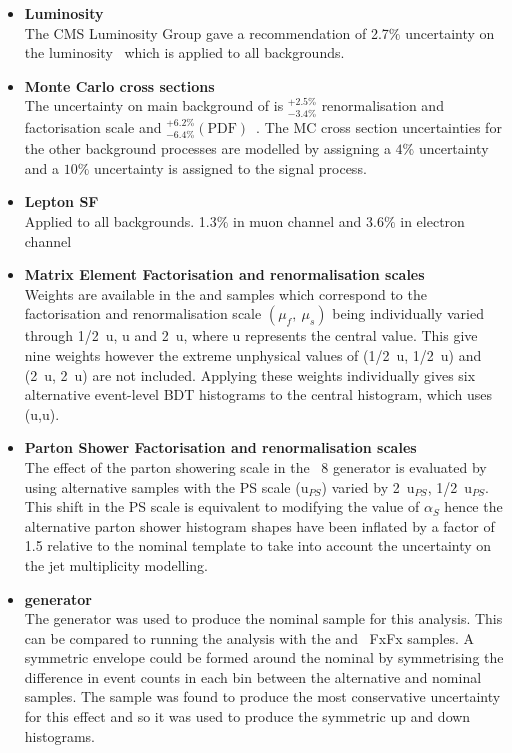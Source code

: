 \begin{itemize}
\item \textbf{Luminosity}\\
The CMS Luminosity Group gave a recommendation of 2.7$\%$ uncertainty on the luminosity~\cite{CMS-PAS-LUM-15-001} which is applied to all backgrounds.
\item \textbf{Monte Carlo cross sections}\\
The uncertainty on main background of \ttbar is ${}^{+2.5\%}_{-3.4\%}$ renormalisation and factorisation scale and ${}^{+6.2\%}_{-6.4\%} \left( \textrm{PDF} \right)$~\cite{PhysRevLett.110.252004}. The MC cross section uncertainties for the other background processes are modelled by assigning a $4\%$ uncertainty and a $10\%$ uncertainty is assigned to the signal process.
\item \textbf{Lepton SF}\\
Applied to all backgrounds. 1.3$\%$ in muon channel and 3.6$\%$ in electron channel
\item \textbf{Matrix Element Factorisation and renormalisation scales}\\
Weights are available in the \ttbar and \tttt samples which correspond to the factorisation and renormalisation scale $\left(\mu_{f},~\mu_{s}\right)$ being individually varied through 1/2~u, u and 2~u, where u represents the central value. This give nine weights however the extreme unphysical values of (1/2~u, 1/2~u) and (2~u, 2~u) are not included. Applying these weights individually gives six alternative event-level BDT histograms to the central histogram, which uses (u,u). 
\item \textbf{Parton Shower Factorisation and renormalisation scales}\\
The effect of the parton showering scale in the \PYTHIA~8 generator is evaluated by using alternative \ttbar samples with the PS scale (u$_{PS}$) varied by 2~u$_{PS}$, 1/2~u$_{PS}$. This shift in the PS scale is equivalent to modifying the value of $\alpha_{S}$ hence the alternative parton shower histogram shapes have been inflated by a factor of 1.5 relative to the nominal template to take into account the uncertainty on the jet multiplicity modelling.
\item \textbf{\ttbar generator}\\
The \POWHEG generator was used to produce the nominal \ttbar sample for this analysis. This can be compared to running the analysis with the \MLM and \MADGRAPH\aMCATNLO~FxFx \ttbar samples. A symmetric envelope could be formed around the nominal by symmetrising the difference in event counts in each bin between the alternative and nominal samples. The \MLM sample was found to produce the most conservative uncertainty for this effect and so it was used to produce the symmetric up and down histograms.

\end{itemize}
